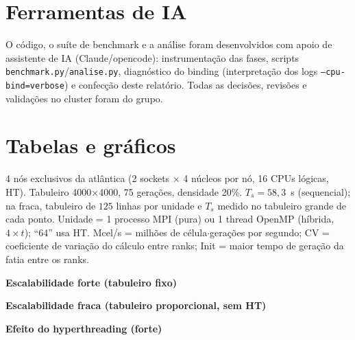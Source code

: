 \documentclass[10pt,twocolumn]{article}
\begin{document}
\section{Ferramentas de IA}
\label{sec:ia}

O código, o suíte de benchmark e a análise foram desenvolvidos com apoio de
assistente de IA (Claude/opencode): instrumentação das fases, scripts
\texttt{benchmark.py}/\texttt{analise.py}, diagnóstico do binding
(interpretação dos logs \texttt{--cpu-bind=verbose}) e confecção deste
relatório. Todas as decisões, revisões e validações no cluster foram do
grupo.

\clearpage
\onecolumn

\section*{Tabelas e gráficos}
\vspace{-4pt}
\noindent\small 4 nós exclusivos da atlântica (2 sockets $\times$ 4 núcleos
por nó, 16 CPUs lógicas, HT). Tabuleiro 4000$\times$4000, 75 gerações,
densidade 20\%. $T_s = 58{,}3$~s (sequencial); na fraca, tabuleiro de
$125$ linhas por unidade e $T_s$ medido no tabuleiro grande de cada ponto.
Unidade = 1 processo MPI (pura) ou 1 thread OpenMP (híbrida, $4{\times}t$);
``64'' usa HT. Mcel/s = milhões de célula$\cdot$gerações por segundo;
CV = coeficiente de variação do cálculo entre ranks; Init = maior tempo de
geração da fatia entre os ranks.

\begin{table}[h]
\centering
\small\textbf{Escalabilidade forte (tabuleiro fixo)}\\[2pt]
\scriptsize\TabForte
\caption{MPI puro e híbrida, tabuleiro 4000$\times$4000.}
\label{tab:forte}
\end{table}

\begin{table}[h]
\centering
\small\textbf{Escalabilidade fraca (tabuleiro proporcional, sem HT)}\\[2pt]
\scriptsize\TabFraca
\caption{Tabuleiro de 125 linhas por unidade.}
\label{tab:fraca}
\end{table}

\begin{table}[h]
\centering
\small\textbf{Efeito do hyperthreading (forte)}\\[2pt]
\scriptsize\TabHT
\caption{32 unidades físicas $\times$ 64 com HT.}
\label{tab:ht}
\end{table}
\end{document}
